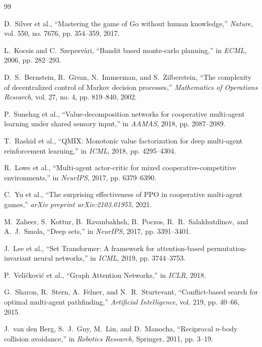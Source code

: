 \documentclass[11pt,a4paper]{article}
\begin{document}
\begin{thebibliography}{99}

D.~Silver et al., ``Mastering the game of Go without human knowledge,'' {\it Nature}, vol. 550, no. 7676, pp. 354--359, 2017.

L.~Kocsis and C.~Szepesv{\'a}ri, ``Bandit based monte-carlo planning,'' in {\it ECML}, 2006, pp. 282--293.

D.~S.~Bernstein, R.~Givan, N.~Immerman, and S.~Zilberstein, ``The complexity of decentralized control of Markov decision processes,'' {\it Mathematics of Operations Research}, vol. 27, no. 4, pp. 819--840, 2002.

P.~Sunehag et al., ``Value-decomposition networks for cooperative multi-agent learning under shared sensory input,'' in {\it AAMAS}, 2018, pp. 2087--2089.

T.~Rashid et al., ``QMIX: Monotonic value factorization for deep multi-agent reinforcement learning,'' in {\it ICML}, 2018, pp. 4295--4304.

R.~Lowe et al., ``Multi-agent actor-critic for mixed cooperative-competitive environments,'' in {\it NeurIPS}, 2017, pp. 6379--6390.

C.~Yu et al., ``The surprising effectiveness of PPO in cooperative multi-agent games,'' {\it arXiv preprint arXiv:2103.01955}, 2021.

M.~Zaheer, S.~Kottur, B.~Ravanbakhsh, B.~Poczos, R.~R.~Salakhutdinov, and A.~J.~Smola, ``Deep sets,'' in {\it NeurIPS}, 2017, pp. 3391--3401.

J.~Lee et al., ``Set Transformer: A framework for attention-based permutation-invariant neural networks,'' in {\it ICML}, 2019, pp. 3744--3753.

P.~Veli{\v{c}}kovi{\'{c}} et al., ``Graph Attention Networks,'' in {\it ICLR}, 2018.

G.~Sharon, R.~Stern, A.~Felner, and N.~R.~Sturtevant, ``Conflict-based search for optimal multi-agent pathfinding,'' {\it Artificial Intelligence}, vol. 219, pp. 40--66, 2015.

J.~van den Berg, S.~J.~Guy, M.~Lin, and D.~Manocha, ``Reciprocal $n$-body collision avoidance,'' in {\it Robotics Research}, Springer, 2011, pp. 3--19.


\end{thebibliography}
\end{document}
